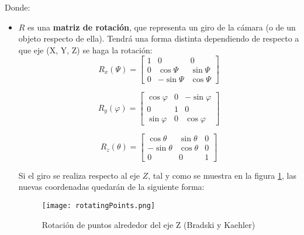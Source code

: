 Donde: 
\begin{itemize}
 
\item $R$ es una \textbf{matriz de rotación}, que representa un giro de la cámara (o de un objeto respecto de ella). Tendrá una forma distinta dependiendo de respecto a que eje (X, Y, Z) se haga la rotación:
  \begin{equation}
    R_x(\Psi)=\begin{bmatrix}
      1 & 0         & 0        \\ 
      0 & \cos\Psi  & \sin\Psi \\ 
      0 & -\sin\Psi & \cos\Psi
    \end{bmatrix}
  \end{equation}

  \begin{equation}
    R_y(\varphi)=\begin{bmatrix}
      \cos\varphi & 0 & -\sin\varphi \\ 
      0           & 1 & 0            \\ 
      \sin\varphi & 0 & \cos\varphi
    \end{bmatrix}
  \end{equation}

  \begin{equation}
    R_z(\theta)=\begin{bmatrix}
      \cos\theta  & \sin\theta & 0 \\ 
      -\sin\theta & \cos\theta & 0 \\ 
      0           & 0          & 1
    \end{bmatrix}
  \end{equation}

Si el giro se realiza respecto al eje $Z$, tal y como se muestra en la figura \ref{fig:rotatingPoints}, las nuevas coordenadas quedarán de la siguiente forma:

  \begin{figure}[h]
    \centering
    \texttt{[image: rotatingPoints.png]}
    \caption{Rotación de puntos alrededor del eje Z (Bradski y Kaehler)}
    \label{fig:rotatingPoints}
  \end{figure}


\end{itemize}
